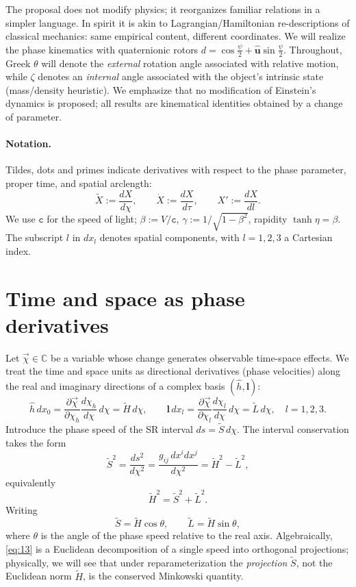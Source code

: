 \documentclass[11pt]{article}
\numberwithin{equation}{section}
\begin{document}
The proposal does not modify physics; it reorganizes familiar relations in a simpler language. In spirit it is akin to Lagrangian/Hamiltonian re-descriptions of classical mechanics: same empirical content, different coordinates. We will realize the phase kinematics with quaternionic rotors $d=\cos\tfrac{\psi}{2}+\hat{\mathbf u}\sin\tfrac{\psi}{2}$. Throughout, Greek $\theta$ will denote the \emph{external} rotation angle associated with relative motion, while $\zeta$ denotes an \emph{internal} angle associated with the object's intrinsic state (mass/density heuristic). We emphasize that no modification of Einstein's dynamics is proposed; all results are kinematical identities obtained by a change of parameter.

\paragraph{Notation.} Tildes, dots and primes indicate derivatives with respect to the phase parameter, proper time, and spatial arclength:
\[
\tilde{X}:=\frac{dX}{d\chi},\qquad \dot{X}:=\frac{dX}{d\tau},\qquad X':=\frac{dX}{dl}.
\]
We use $\mathtt{c}$ for the speed of light; $\beta:=V/\mathtt{c}$, $\gamma:=1/\sqrt{1-\beta^2}$, rapidity $\tanh\eta=\beta$. The subscript $l$ in $dx_l$ denotes spatial components, with $l=1,2,3$ a Cartesian index.

\section{Time and space as phase derivatives}
Let $\vec{\chi}\in\mathbb{C}$ be a variable whose change generates observable time-space effects. We treat the time and space units as directional derivatives (phase velocities) along the real and imaginary directions of a complex basis $(\hat{h},\mathbf{l})$:
\begin{equation}
\hat{h}\,dx_0=\frac{\partial\vec{\chi}}{\partial\chi_h}\frac{d\chi_h}{d\chi}\,d\chi
=\tilde{H}\,d\chi,\qquad
\mathbf{l}\,dx_l=\frac{\partial\vec{\chi}}{\partial\chi_l}\frac{d\chi_l}{d\chi}\,d\chi
=\tilde{L}\,d\chi,\quad l=1,2,3.
\label{eq:11}
\end{equation}
Introduce the phase speed of the SR interval $ds=\tilde{S}\,d\chi$. The interval conservation takes the form
\begin{equation}
\tilde{S}^2=\frac{ds^2}{d\chi^2}
=\frac{g_{ij}\,dx^i dx^j}{d\chi^2}
=\tilde{H}^2-\tilde{L}^2,
\label{eq:12}
\end{equation}
equivalently
\begin{equation}
\tilde{H}^2=\tilde{S}^2+\tilde{L}^2.
\label{eq:13}
\end{equation}
Writing 
\begin{equation}
\tilde{S}=\tilde{H}\cos\theta,\qquad \tilde{L}=\tilde{H}\sin\theta,
\label{eq:14}
\end{equation}
where $\theta$ is the angle of the phase speed relative to the real axis. Algebraically, \eqref{eq:13} is a Euclidean decomposition of a single speed into orthogonal projections; physically, we will see that under reparameterization the \emph{projection} $\tilde{S}$, not the Euclidean norm $\tilde{H}$, is the conserved Minkowski quantity.
\end{document}
